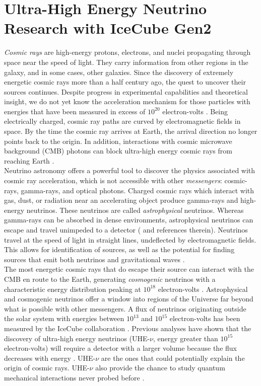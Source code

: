 \documentclass[../../../main.tex]{subfiles}
\begin{document}
\section{Ultra-High Energy Neutrino Research with IceCube Gen2}
\label{sec:neutrino}

\textit{Cosmic rays} are high-energy protons, electrons, and nuclei propagating through space near the speed of light.  They carry information from other regions in the galaxy, and in some cases, other galaxies.  Since the discovery of extremely energetic cosmic rays more than a half century ago, the quest to uncover their sources continues.  Despite progress in experimental capabilities and theoretical insight, we do not yet know the acceleration mechanism for those particles with energies that have been measured in excess of $10^{20}$ electron-volts \cite{10.1088/1742-6596/1766/1/012002}.  Being electrically charged, cosmic ray paths are curved by electromagnetic fields in space.  By the time the cosmic ray arrives at Earth, the arrival direction no longer points back to the origin.  In addition, interactions with cosmic microwave background (CMB) photons can block ultra-high energy cosmic rays from reaching Earth \cite{PhysRevLett.16.748} \cite{1966JETPL...4...78Z}.
\\
\vspace{0.15cm}
Neutrino astronomy offers a powerful tool to discover the physics associated with cosmic ray acceleration, which is not accessible with other \textit{messengers}: cosmic-rays, gamma-rays, and  optical photons. Charged cosmic rays which interact with gas, dust, or radiation near an accelerating object produce gamma-rays and high-energy neutrinos.  These neutrinos are called \textit{astrophysical} neutrinos. Whereas gamma-rays can be absorbed in dense environments, astrophysical neutrinos can escape and travel unimpeded to a detector (\cite{Astro2020_1} and references therein). Neutrinos travel at the speed of light in straight lines, undeflected by electromagnetic fields.  This allows for identification of sources, as well as the potential for finding sources that emit both neutrinos and gravitational waves \cite{10.3847/2041-8213/ab9d24}.
\\
\vspace{0.15cm}
The most energetic cosmic rays that do escape their source can interact with the CMB en route to the Earth, generating \textit{cosmogenic} neutrinos with a characteristic energy distribution peaking at $10^{18}$ electron-volts \cite{10.1007/bf00645585} \cite{BERESINSKY1969423}.  Astrophysical and cosmogenic neutrinos offer a window into regions of the Universe far beyond what is possible with other messengers.  A flux of neutrinos originating outside the solar system with energies between $10^{13}$ and $10^{15}$ electron-volts has been measured by the IceCube collaboration \cite{PhysRevLett.111.021103}. Previous analyses have shown that the discovery of ultra-high energy neutrinos (UHE-$\nu$, energy greater than $10^{15}$ electron-volts) will require a detector with a larger volume because the flux decreases with energy \cite{PhysRevD.98.062003}. UHE-$\nu$ are the ones that could potentially explain the origin of cosmic rays.  UHE-$\nu$ also provide the chance to study quantum mechanical interactions never probed before \cite{Astro2020_1} \cite{Astro2020_2}.
\end{document}
